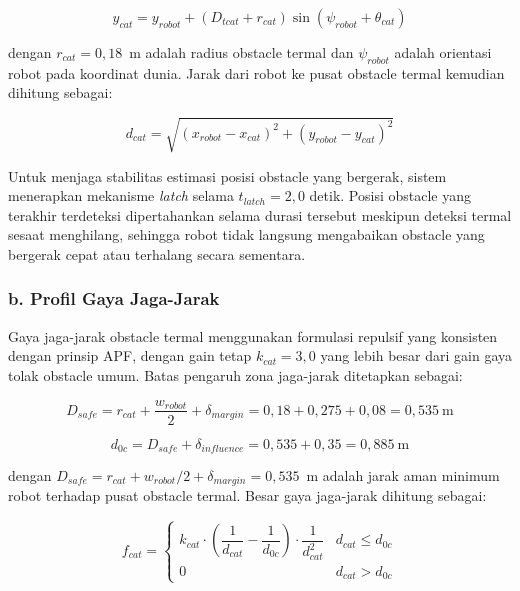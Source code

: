 \begin{equation}
    y_{cat} = y_{robot} + (D_{tcat} + r_{cat})
              \sin(\psi_{robot} + \theta_{cat})
    \label{eq:ycat}
\end{equation}
 
dengan $r_{cat} = 0{,}18$~m adalah radius obstacle termal dan
$\psi_{robot}$ adalah orientasi robot pada koordinat dunia. Jarak
dari robot ke pusat obstacle termal kemudian dihitung sebagai:
 
\begin{equation}
    d_{cat} = \sqrt{(x_{robot} - x_{cat})^{2} +
                    (y_{robot} - y_{cat})^{2}}
    \label{eq:dcat}
\end{equation}
 
Untuk menjaga stabilitas estimasi posisi obstacle yang bergerak,
sistem menerapkan mek\-anisme \textit{latch} selama $t_{latch} = 2{,}0$
detik. Posisi obstacle yang terakhir terdeteksi dipertahankan selama
durasi tersebut meskipun deteksi termal sesaat menghilang, sehingga
robot tidak langsung mengabaikan obstacle yang bergerak cepat atau
terhalang secara sementara.
 
 
\subsubsection*{b. Profil Gaya Jaga-Jarak}

Gaya jaga-jarak obstacle termal menggunakan formulasi repulsif
yang konsisten dengan prinsip APF, dengan gain tetap $k_{cat} = 3{,}0$
yang lebih besar dari gain gaya tolak obstacle umum. Batas pengaruh
zona jaga-jarak ditetapkan sebagai:

\begin{equation}
    D_{safe} = r_{cat} + \frac{w_{robot}}{2} + \delta_{margin}
             = 0{,}18 + 0{,}275 + 0{,}08 = 0{,}535~\text{m}
    \label{eq:dsafe}
\end{equation}

\begin{equation}
    d_{0c} = D_{safe} + \delta_{influence}
           = 0{,}535 + 0{,}35 = 0{,}885~\text{m}
    \label{eq:d0c}
\end{equation}

dengan $D_{safe} = r_{cat} + w_{robot}/2 + \delta_{margin}
= 0{,}535$~m adalah jarak aman minimum robot terhadap pusat
obstacle termal. Besar gaya jaga-jarak dihitung sebagai:

\begin{equation}
    f_{cat} =
    \begin{cases}
        k_{cat} \cdot
        \left(\dfrac{1}{d_{cat}} - \dfrac{1}{d_{0c}}\right)
        \cdot \dfrac{1}{d_{cat}^{2}}
            & d_{cat} \leq d_{0c} \\[10pt]
        0   & d_{cat} > d_{0c}
    \end{cases}
    \label{eq:fcat}
\end{equation}

